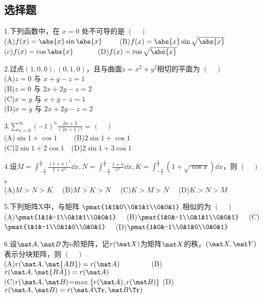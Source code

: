 
\subsection{选择题}
1.下列函数中，在 $x=0$ 处不可导的是 $(\quad)$\\
(A)$f(x)=\abs{x} \sin \abs{x} \qquad$  (B)$f(x)=\abs{x} \sin \sqrt{\abs{x}}$\\
(c)$f(x)=\cos \abs{x} \qquad \quad$  (D)$ f(x)=\cos \sqrt{\abs{x}}$

2.过点$(1,0,0),(0,1,0)$，且与曲面$z=x^2+y^2$相切的平面为 $(\quad)$\\
(A)$z=0$ 与 $x+y-z=1$\\
(B)$z=0$ 与 $2x+2y-z=2$\\
(C)$x=y$ 与 $x+y-z=1$\\
(D)$x=y$ 与 $2x+2y-z=2$

3.$\displaystyle \sum_{n=0}^\infty (-1)^n \frac{2n+3}{(2n+1)!}$ = $(\quad)$ \\
(A)$\sin 1+\cos 1 \qquad$  (B)$2\sin 1+\cos 1$ \\
(C)$2\sin 1+2\cos 1  \quad$(D)$2\sin 1+3\cos 1$

4.设$\displaystyle M=\int_{-\frac{\pi}{2}}^\frac{\pi}{2}\frac{(1+x)^2}{1+x^2}\dd{x},N=\int_{-\frac{\pi}{2}}^\frac{\pi}{2}\frac{1+x}{e^x}\dd{x},K=\int_{-\frac{\pi}{2}}^\frac{\pi}{2}(1+\sqrt{\cos x})\dd{x}$，则 $(\quad)$ 。\\
(A)$M>N>K \quad$ (B)$M>K>N \quad$ (C)$K>M>N \quad$ (D)$K>N>M$

5.下列矩阵X中，与矩阵 $\pmat{1&1&0\\0&1&1\\0&0&1}$ 相似的为 $(\quad)$\\
(A)$\pmat{1&1&-1\\0&1&1\\0&0&1} \quad$
(B)$\pmat{1&0&-1\\0&1&1\\0&0&1} \quad$
(C)$\pmat{1&1&-1\\0&1&0\\0&0&1} \quad$
(D)$\pmat{1&0&-1\\0&1&0\\0&0&1}$

6.设$\mat A,\mat B$为$n$阶矩阵，记$r(\mat X)$为矩阵$\mat X$的秩，$(\mat X,\mat Y)$表示分块矩阵，则 $(\quad)$ \\
(A)$r(\mat A,\mat {AB})=r(\mat A) \qquad \qquad$
(B)$r(\mat A,\mat {BA})=r(\mat A) \quad$\\
(C)$r(\mat A,\mat B)$=max $ \{r(\mat A),r(\mat B)\}$
(D)$r(\mat A,\mat B)=r(\mat A \Tr,\mat B \Tr)$

